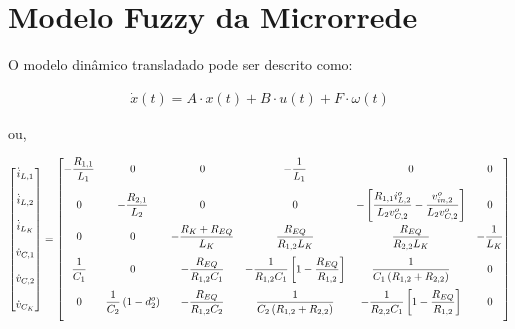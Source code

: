 \section*{Modelo Fuzzy da Microrrede}

O modelo dinâmico transladado pode ser descrito como:

\begin{gather*}
    \dot{x}(t) = A \cdot x(t) + B \cdot u(t) + F \cdot \omega(t)
\end{gather*}

ou,

\begin{gather}
  \begin{bmatrix}
    \dot{i}_{L,1} \\[12pt] \dot{i}_{L,2} \\[12pt] \dot{i}_{L_K} \\[12pt]
    \dot{v}_{C,1} \\[12pt] \dot{v}_{C,2} \\[12pt] \dot{v}_{C_K}
  \end{bmatrix} =
  \begin{bmatrix}
    \displaystyle - \frac{R_{1,1}}{L_1} & 0                         & 0                                         & \displaystyle - \frac{1}{L_1}                  & 0                                    & 0                           \\[12pt]
    0                         & \displaystyle - \frac{R_{2,1}}{L_2} & 0                                         & 0                                    & \displaystyle - \left[ \frac{R_{1,1} i_{L,2}^o}{L_2 v_{C,2}^o} - \frac{v_{in,2}^o}{L_2 v_{C,2}^o} \right]                  & 0                           \\[12pt]
    0                         & 0                         & - \displaystyle \frac{R_K + R_{EQ}}{L_K}   & \displaystyle \frac{R_{EQ}}{R_{1,2} L_K}              & \displaystyle \frac{R_{EQ}}{R_{2,2} L_K}              & - \displaystyle \frac{1}{L_K}         \\[12pt]
    \displaystyle \frac{1}{C_1}         & 0                         & \displaystyle - \frac{R_{EQ}}{R_{1,2} C_1}                 & \displaystyle - \frac{1}{R_{1,2}C_1} \left[ 1 - \frac{R_{EQ}}{R_{1,2}} \right] & \displaystyle \frac{1}{C_1 \left(R_{1,2} + R_{2,2}\right)}       & 0                           \\[12pt]
    0                         & \displaystyle \frac{1}{C_2} \left( 1 - d_2^o \right)         & \displaystyle - \frac{R_{EQ}}{R_{1,2} C_2} & \displaystyle \frac{1}{C_2 \left(R_{1,2} + R_{2,2}\right)}      & \displaystyle - \frac{1}{R_{2,2}C_1} \left[ 1 - \frac{R_{EQ}}{R_{1,2}} \right] & 0                           \\[12pt]

\end{bmatrix}
\end{gather}
